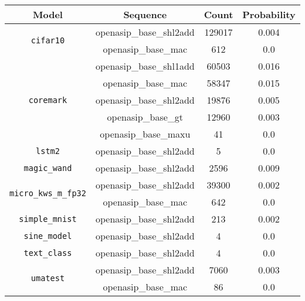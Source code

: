 \begin{tabular}{|c|c|c|c|}
    \hline
    \textbf{Model} & \textbf{Sequence} & \textbf{Count} & \textbf{Probability} \\ \hline

    \multirow{2}{*}{\texttt{cifar10}} & openasip\_base\_shl2add & 129017 & 0.004 \\ \cline{2-4}
                                      & openasip\_base\_mac     & 612    & 0.0   \\ \hline

    \multirow{5}{*}{\texttt{coremark}} & openasip\_base\_shl1add & 60503  & 0.016 \\ \cline{2-4}
                                       & openasip\_base\_mac     & 58347  & 0.015 \\ \cline{2-4}
                                       & openasip\_base\_shl2add & 19876  & 0.005 \\ \cline{2-4}
                                       & openasip\_base\_gt      & 12960  & 0.003 \\ \cline{2-4}
                                       & openasip\_base\_maxu    & 41     & 0.0   \\ \hline

    \multirow{1}{*}{\texttt{lstm2}}    & openasip\_base\_shl2add & 5      & 0.0   \\ \hline

    \multirow{1}{*}{\texttt{magic\_wand}} & openasip\_base\_shl2add & 2596 & 0.009 \\ \hline

    \multirow{2}{*}{\texttt{micro\_kws\_m\_fp32}} & openasip\_base\_shl2add & 39300 & 0.002 \\ \cline{2-4}
                                                  & openasip\_base\_mac     & 642   & 0.0   \\ \hline

    \multirow{1}{*}{\texttt{simple\_mnist}} & openasip\_base\_shl2add & 213   & 0.002 \\ \hline

    \multirow{1}{*}{\texttt{sine\_model}}   & openasip\_base\_shl2add & 4     & 0.0   \\ \hline

    \multirow{1}{*}{\texttt{text\_class}}   & openasip\_base\_shl2add & 4     & 0.0   \\ \hline

    \multirow{2}{*}{\texttt{umatest}}       & openasip\_base\_shl2add & 7060  & 0.003 \\ \cline{2-4}
                                            & openasip\_base\_mac     & 86    & 0.0   \\ \hline

\end{tabular}

